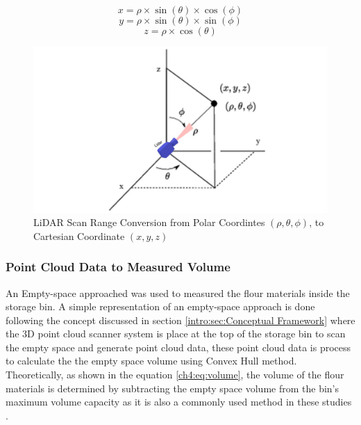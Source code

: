 \begin{equation}
	\label{ch3:eq:x}
	x = \rho \times \sin(\theta) \times \cos(\phi)
\end{equation}
\begin{equation}
	\label{ch3:eq:y}
	y = \rho \times \sin(\theta) \times \sin(\phi)
\end{equation}
\begin{equation}
	\label{ch3:eq:z}
	z = \rho \times \cos(\theta)
\end{equation}

\begin{figure}[H]
	\centering
	\includegraphics[width=1\textwidth]{Figures/point cloud conversion}
	\caption{LiDAR Scan Range Conversion from Polar Coordintes $(\rho,\theta,\phi)$, to Cartesian Coordinate $(x,y,z)$}
	\label{ch3:fig:point_cloud_conversion}
\end{figure}

\subsubsection{Point Cloud Data to Measured Volume}
\label{ch3:sec:Volume Estimation}
An Empty-space approached was used to measured the flour materials inside the storage bin. A simple representation of an empty-space approach is done following the concept discussed in section \ref{intro:sec:Conceptual Framework} where the 3D point cloud scanner system is place at the top of the storage bin to scan the empty space and generate point cloud data,  these point cloud data is process to calculate the the empty space volume using Convex Hull method. Theoretically, as shown in the equation \ref{ch4:eq:volume}, the volume of the flour materials is determined by subtracting the empty space volume from the bin's maximum volume capacity as it is also a commonly used method in these studies \citet{raba2020,clar2022}.

